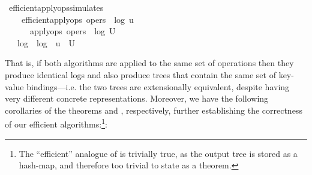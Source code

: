 \documentclass[sigconf]{acmart}
\renewenvironment{isabelle}{%
  \medbreak\noindent%
  \renewcommand{\isanewline}{\\}%
  \begin{minipage}{\columnwidth}%
  \begin{isabellebody}%
  \begin{tabbing}%
}{%
  \end{tabbing}%
  \end{isabellebody}%
  \end{minipage}%
  \medbreak%
}
\renewcommand{\isacartoucheopen}{}
\renewcommand{\isacartoucheclose}{}
\begin{document}
\begin{isabelle}
\isamarkupfalse%
\ efficient{\isacharunderscore}apply{\isacharunderscore}ops{\isacharunderscore}simulates{\isacharcolon}\isanewline
\ \ \ {}{\isacharcolon}\ {\isacartoucheopen}efficient{\isacharunderscore}apply{\isacharunderscore}ops\ opers\ {\isacharequal}\ {\isacharparenleft}log{}{\isacharcomma}\ u{\isacharparenright}{\isacartoucheclose}\isanewline
\ \ \ \ \ {}{\isacharcolon}\ {\isacartoucheopen}apply{\isacharunderscore}ops\ opers\ {\isacharequal}\ {\isacharparenleft}log{}{\isacharcomma}\ U{\isacharparenright}{\isacartoucheclose}\isanewline
\ \ \ {\isacartoucheopen}log{}\ {\isacharequal}\ log{}\ {\isasymand}\ u\ {\isasympreceq}\ U{\isacartoucheclose}
\end{isabelle}

That is, if both algorithms are applied to the same set of operations then they produce identical logs and also produce trees that contain the same set of key-value bindings---i.e. the two trees are extensionally equivalent, despite having very different concrete representations.
Moreover, we have the following corollaries of the theorems  and , respectively, further establishing the correctness of our efficient algorithms:\footnote{The ``efficient'' analogue of  is trivially true, as the output tree is stored as a hash-map, and therefore too trivial to state as a theorem.}:
\end{document}
